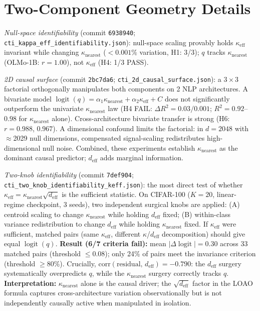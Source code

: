 \documentclass{article}
\DeclareMathOperator{\logit}{logit}
\begin{document}
\section{Two-Component Geometry Details}
\label{app:twocomp-details}
\textit{Null-space identifiability} (commit \texttt{6938940}; \texttt{cti\_kappa\_eff\_identifiability.json}): null-space scaling provably holds $\kappa_{\mathrm{eff}}$ invariant while changing $\kappa_{\mathrm{nearest}}$ ($<0.001\%$ variation, H1: 3/3); $q$ tracks $\kappa_{\mathrm{nearest}}$ (OLMo-1B: $r=1.00$), not $\kappa_{\mathrm{eff}}$ (H4: 1/3 PASS).

\textit{2D causal surface} (commit \texttt{2bc7da6}; \texttt{cti\_2d\_causal\_surface.json}): a $3\times3$ factorial orthogonally manipulates both components on 2 NLP architectures. A bivariate model $\logit(q)=\alpha_1\kappa_{\mathrm{nearest}}+\alpha_2\kappa_{\mathrm{eff}}+C$ does not significantly outperform the univariate $\kappa_{\mathrm{nearest}}$ law (H4 FAIL: $\Delta R^2=0.03/0.001$; $R^2=0.92$--$0.98$ for $\kappa_{\mathrm{nearest}}$ alone). Cross-architecture bivariate transfer is strong (H6: $r=0.988$, $0.967$). A dimensional confound limits the factorial: in $d=2048$ with $\approx$2029 null dimensions, compensated signal-scaling redistributes high-dimensional null noise. Combined, these experiments establish $\kappa_{\mathrm{nearest}}$ as the dominant causal predictor; $d_{\mathrm{eff}}$ adds marginal information.

\textit{Two-knob identifiability} (commit \texttt{7def904}; \texttt{cti\_two\_knob\_identifiability\_keff.json}): the most direct test of whether $\kappa_{\mathrm{eff}}=\kappa_{\mathrm{nearest}}\sqrt{d_{\mathrm{eff}}}$ is the sufficient statistic.
On CIFAR-100 ($K=20$, linear-regime checkpoint, 3 seeds), two independent surgical knobs are applied: (A) centroid scaling to change $\kappa_{\mathrm{nearest}}$ while holding $d_{\mathrm{eff}}$ fixed; (B) within-class variance redistribution to change $d_{\mathrm{eff}}$ while holding $\kappa_{\mathrm{nearest}}$ fixed.
If $\kappa_{\mathrm{eff}}$ were sufficient, matched pairs (same $\kappa_{\mathrm{eff}}$, different $\kappa$/$d_{\mathrm{eff}}$ decomposition) should give equal $\logit(q)$.
\textbf{Result (6/7 criteria fail):} mean $|\Delta\logit|=0.30$ across 33 matched pairs (threshold $\leq0.08$); only 24\% of pairs meet the invariance criterion (threshold $\geq80\%$).
Crucially, $\mathrm{corr}(\mathrm{residual},\, d_{\mathrm{eff}})=-0.790$: the $d_{\mathrm{eff}}$ surgery systematically overpredicts $q$, while the $\kappa_{\mathrm{nearest}}$ surgery correctly tracks $q$.
\textbf{Interpretation:} $\kappa_{\mathrm{nearest}}$ alone is the causal driver; the $\sqrt{d_{\mathrm{eff}}}$ factor in the LOAO formula captures cross-architecture variation observationally but is not independently causally active when manipulated in isolation.
\end{document}
